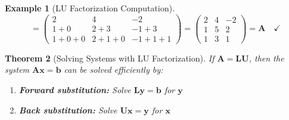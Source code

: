 \documentclass[12pt]{article}
\numberwithin{equation}{section}
\newcommand{\vect}[1]{\boldsymbol{#1}}   %
\newcommand{\mat}[1]{\mathbf{#1}}        %
\theoremstyle{plain}
\newtheorem{theorem}{Theorem}[section]
\theoremstyle{definition}
\newtheorem{example}[theorem]{Example}
\theoremstyle{remark}
\begin{document}
\begin{example}[LU Factorization Computation]
$$= \begin{pmatrix} 2 & 4 & -2 \\ 1 + 0 & 2 + 3 & -1 + 3 \\ 1 + 0 + 0 & 2 + 1 + 0 & -1 + 1 + 1 \end{pmatrix} = \begin{pmatrix} 2 & 4 & -2 \\ 1 & 5 & 2 \\ 1 & 3 & 1 \end{pmatrix} = \mat{A} \quad \checkmark$$
\end{example}

\begin{theorem}[Solving Systems with LU Factorization]
If $\mat{A} = \mat{L}\mat{U}$, then the system $\mat{A}\vect{x} = \vect{b}$ can be solved efficiently by:
\begin{enumerate}
\item \textbf{Forward substitution:} Solve $\mat{L}\vect{y} = \vect{b}$ for $\vect{y}$
\item \textbf{Back substitution:} Solve $\mat{U}\vect{x} = \vect{y}$ for $\vect{x}$
\end{enumerate}
\end{theorem}
\end{document}
